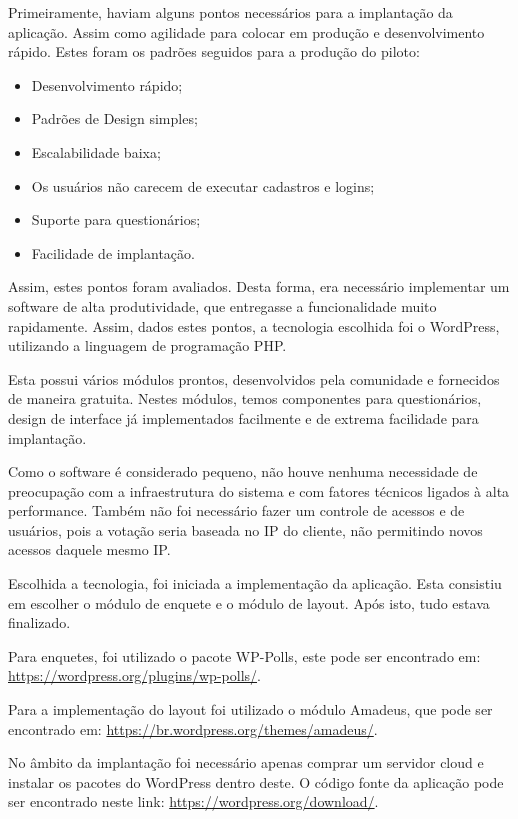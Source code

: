 Primeiramente, haviam alguns pontos necessários para a implantação da aplicação. Assim como agilidade para colocar
em produção e desenvolvimento rápido. Estes foram os padrões seguidos para a produção do piloto:


\begin{itemize}
    \item Desenvolvimento rápido;
    \item Padrões de Design simples;
    \item Escalabilidade baixa;
    \item Os usuários não carecem de executar cadastros e logins;
    \item Suporte para questionários;
    \item Facilidade de implantação.
\end{itemize}

Assim, estes pontos foram avaliados. Desta forma, era necessário implementar um software
de alta produtividade, que entregasse a funcionalidade muito rapidamente. Assim, dados estes
pontos, a tecnologia escolhida foi o WordPress, utilizando a linguagem de programação PHP.

Esta possui vários módulos prontos, desenvolvidos pela comunidade e fornecidos de maneira
gratuita. Nestes módulos, temos componentes para questionários, design de interface já
implementados facilmente e de extrema facilidade para implantação.

Como o software é considerado pequeno, não houve nenhuma necessidade de preocupação com a
infraestrutura  do sistema e com fatores técnicos ligados à alta performance. Também não foi
necessário fazer um controle de acessos e de usuários, pois a votação seria baseada no IP
do cliente, não permitindo novos acessos daquele mesmo IP.

Escolhida a tecnologia, foi iniciada a implementação da aplicação. Esta consistiu em escolher o
módulo de enquete e o módulo de layout. Após isto, tudo estava finalizado.

Para enquetes, foi
utilizado o pacote WP-Polls, este pode ser encontrado em: \url{https://wordpress.org/plugins/wp-polls/}.

Para a implementação do layout foi utilizado o módulo Amadeus, que pode ser encontrado em:
\url{https://br.wordpress.org/themes/amadeus/}.

No âmbito da implantação foi necessário apenas comprar um servidor cloud e instalar os pacotes do WordPress
dentro deste. O código fonte da aplicação pode ser encontrado neste link:
\url{https://wordpress.org/download/}.

